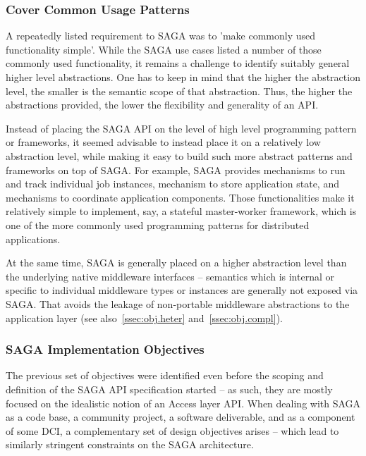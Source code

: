\documentclass[a4paper,12pt]{article}
\begin{document}
   \subsubsection*{Cover Common Usage Patterns}


    A repeatedly listed requirement to SAGA was to 'make commonly used
    functionality simple'.  While the SAGA use cases listed a number
    of those commonly used functionality, it remains a challenge to
    identify suitably general higher level abstractions.  One has to
    keep in mind that the higher the abstraction level, the smaller is
    the semantic scope of that abstraction.  Thus, the higher the
    abstractions provided, the lower the flexibility and generality of
    an API.

    Instead of placing the SAGA API on the level of high level
    programming pattern or frameworks, it seemed advisable to instead
    place it on a relatively low abstraction level, while making it
    easy to build such more abstract patterns and frameworks on top of
    SAGA.  For example, SAGA provides mechanisms to run and track
    individual job instances, mechanism to store application state,
    and mechanisms to coordinate application components.  Those
    functionalities make it relatively simple to implement, say,
    a stateful master-worker framework, which is one of the more
    commonly used programming patterns for distributed applications.

    At the same time, SAGA is generally placed on a higher abstraction
    level than the underlying native middleware interfaces --
    semantics which is internal or specific to individual middleware
    types or instances are generally not exposed via SAGA.  That
    avoids the leakage of non-portable middleware abstractions to the
    application layer (see also~\ref{ssec:obj.heter}
    and~\ref{ssec:obj.compl}).


  \subsubsection{SAGA Implementation Objectives}
  \label{sec:obj.impl}

   The previous set of objectives were identified even before the
   scoping and definition of the SAGA API specification started -- as
   such, they are mostly focused on the idealistic notion of an Access
   layer API.  When dealing with SAGA as a code base, a community
   project, a software deliverable, and as a component of some DCI, a
   complementary set of design objectives arises -- which lead to
   similarly stringent constraints on the SAGA architecture.
\end{document}

